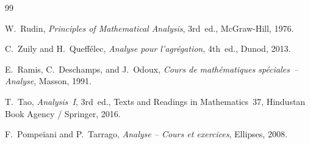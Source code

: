 \documentclass[12pt,a4paper,openany]{book}
\theoremstyle{definition}
\theoremstyle{remark}
\begin{document}
\begin{thebibliography}{99}

W.~Rudin,
\textit{Principles of Mathematical Analysis},
3rd~ed., McGraw-Hill, 1976.

C.~Zuily and H.~Queff\'elec,
\textit{Analyse pour l'agr\'egation},
4th~ed., Dunod, 2013.

E.~Ramis, C.~Deschamps, and J.~Odoux,
\textit{Cours de math\'ematiques sp\'eciales~-- Analyse},
Masson, 1991.

T.~Tao,
\textit{Analysis~I},
3rd~ed., Texts and Readings in Mathematics~37,
Hindustan Book Agency / Springer, 2016.

F.~Pompe\"{i}ani and P.~Tarrago,
\textit{Analyse -- Cours et exercices},
Ellipses, 2008.

\end{thebibliography}

\printindex
\end{document}
